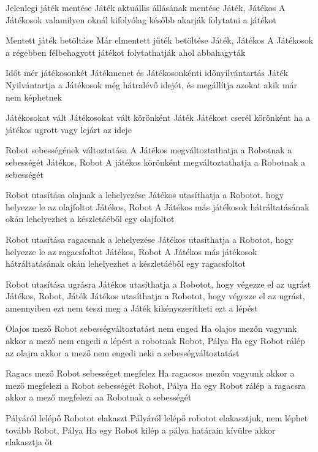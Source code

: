 \usecase%
{Jelenlegi játék mentése}%
{Játék aktuállis állásának mentése}%
{Játék, Játékos}%
{A Játékosok valamilyen oknál kifolyólag később akarják folytatni a játékot}

\usecase%
{Mentett játék betöltáse}%
{Már elmentett jűték betöltése}%
{Játék, Játékos}%
{A Játékosok a régebben félbehagyott játékot folytathatják ahol abbahagyták}

\usecase%
{Időt mér játékosonkét}%
{Játékmenet és Játékosonkénti időnyilvántartás}%
{Játék}%
{Nyilvántartja a Játékosok még hátralévő idejét, és megállítja azokat akik már nem képhetnek}

\usecase%
{Játékosokat vált}%
{Játékosokat vált körönként}%
{Játék}%
{Játékost cserél körönként ha a játékos ugrott vagy lejárt az ideje}

\usecase%
{Robot sebességének változtatása}%
{A Játékos megváltoztathatja a Robotnak a sebességét}%
{Játékos, Robot}%
{A játékos körönként megváltoztathatja a Robotnak a sebességét}

\usecase%
{Robot utasítása olajnak a lehelyezése}%
{Játékos utasíthatja a Robotot, hogy helyezze le az olajfoltot}%
{Játékos, Robot}%
{A Játékos más játékosok hátráltatásának okán lehelyezhet a készletáéből egy olajfoltot}

\usecase%
{Robot utasítása ragacsnak a lehelyezése}%
{Játékos utasíthatja a Robotot, hogy helyezze le az ragacsfoltot}%
{Játékos, Robot}%
{A Játékos más játékosok hátráltatásának okán lehelyezhet a készletáéből egy ragacsfoltot}

\usecase%
{Robot utasítása ugrásra}%
{Játékos utasíthatja a Robotot, hogy végezze el az ugrást}%
{Játékos, Robot, Játék}%
{Játékos utasíthatja a Robotot, hogy végezze el az ugrást, amennyiben ezt nem teszi meg a Játék kikényszerítheti ezt a lépést}

\usecase%
{Olajos mező Robot sebességváltoztatást nem enged}%
{Ha olajos mezőn vagyunk akkor a mező nem engedi a lépést a robotnak}%
{Robot, Pálya}%
{Ha egy Robot rálép az olajra akkor a mező nem engedi neki a sebességváltoztatást}

\usecase%
{Ragacs mező Robot sebességet megfelez}%
{Ha ragacsos mezőn vagyunk akkor a mező megfelezi a Robot sebességét}%
{Robot, Pálya}%
{Ha egy Robot rálép a ragacsra akkor a mező megfelezi aa Robotnak a sebességét}

\usecase%
{Pályáról lelépő Robotot elakaszt}%
{Pályáról lelépő robotot elakasztjuk, nem léphet tovább}%
{Robot, Pálya}%
{Ha egy Robot kilép a pálya határain kívülre akkor elakasztja őt}

